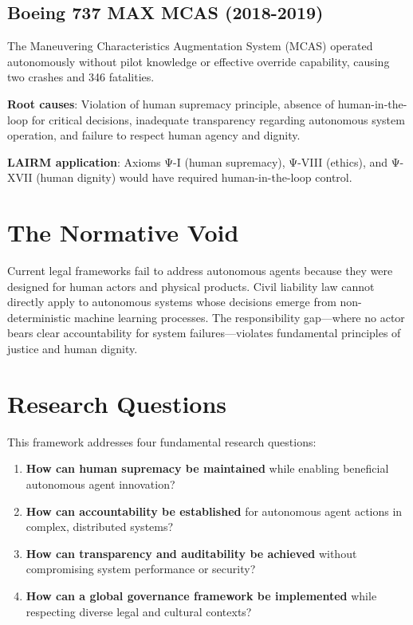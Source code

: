 \documentclass[12pt,a4paper,twoside,openright]{book}
\begin{document}
\subsection{Boeing 737 MAX MCAS (2018-2019)}

The Maneuvering Characteristics Augmentation System (MCAS) operated autonomously without pilot knowledge or effective override capability, causing two crashes and 346 fatalities.

\textbf{Root causes}: Violation of human supremacy principle, absence of human-in-the-loop for critical decisions, inadequate transparency regarding autonomous system operation, and failure to respect human agency and dignity.

\textbf{LAIRM application}: Axioms Ψ-I (human supremacy), Ψ-VIII (ethics), and Ψ-XVII (human dignity) would have required human-in-the-loop control.

\section{The Normative Void}

Current legal frameworks fail to address autonomous agents because they were designed for human actors and physical products. Civil liability law cannot directly apply to autonomous systems whose decisions emerge from non-deterministic machine learning processes. The responsibility gap—where no actor bears clear accountability for system failures—violates fundamental principles of justice and human dignity.

\section{Research Questions}

This framework addresses four fundamental research questions:

\begin{enumerate}
    \item \textbf{How can human supremacy be maintained} while enabling beneficial autonomous agent innovation?
    \item \textbf{How can accountability be established} for autonomous agent actions in complex, distributed systems?
    \item \textbf{How can transparency and auditability be achieved} without compromising system performance or security?
    \item \textbf{How can a global governance framework be implemented} while respecting diverse legal and cultural contexts?
\end{enumerate}
\end{document}
